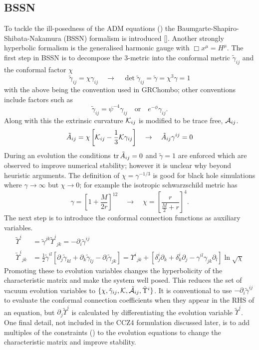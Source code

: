 \subsection{BSSN}
To tackle the ill-posedness of the ADM equations () the Baumgarte-Shapiro-Shibata-Nakamura (BSSN) formalism is introduced []. Another strongly hyperbolic formalism is the generalised harmonic gauge \cite{harmonic} with $ \Box x^\mu = H^\mu$. The first step in BSSN is to decompose the 3-metric into the conformal metric $\tilde{\gamma}_{ij}$ and the conformal factor $\chi$
\begin{equation} \tilde{\gamma}_{ij} = \chi \gamma_{ij}\quad\rightarrow\quad \det{\tilde{\gamma}_{ij}} = \tilde{\gamma} = \chi^3\gamma = 1\end{equation}
with the above being the convention used in GRChombo; other conventions include factors such as
\[  \tilde{\gamma}_{ij} = \psi^{-4}\gamma_{ij} \quad \mathrm{or} \quad e^{-\phi}\gamma_{ij}.\]
 Along with this the extrinsic curvature $\mathcal{K}_{ij}$ is modified to be trace free, $\mathcal{A}_{ij}$.
\[ \tilde{A}_{ij} = \chi\left[ \mathcal{K}_{ij}-\frac{1}{3}\mathcal{K}\gamma_{ij}\right]\quad\rightarrow \quad\tilde{A}_{ij}\gamma^{ij}=0\]
During an evolution the conditions $\trace{\tilde{A}_{ij}=0}$  and $\tilde{\gamma}=1$ are enforced which are observed to improve numerical stability; however it is unclear why beyond heuristic arguments. The definition of $\chi = \gamma^{-1/3}$ is good for black hole simulations where $\gamma\rightarrow\infty$ but $\chi \rightarrow 0$; for example the isotropic schwarzschild metric has \[\gamma = \left[ 1+ \frac{M}{2r}\right]^{12}\quad \rightarrow \quad \chi =\left[ \frac{r}{\frac{M}{2} + r}\right]^4.\] 
The next step is to introduce the conformal connection functions as auxiliary variables. 
\begin{align} \tilde{\Upsilon}^i &= \tilde{\gamma}^{jk}\tilde{\Upsilon}^i_{\,\;jk} = -\partial_i \tilde{\gamma}^{ij}\\
 \tilde{\Upsilon}^i_{\,\;jk} &= \frac{1}{2}\tilde{\gamma}^{il}\left[ \partial_j \tilde{\gamma}_{kl} + \partial_k \tilde{\gamma}_{lj} - \partial_l \tilde{\gamma}_{jk}\right] = \Upsilon^i_{\;\,jk} + \left[ \delta^i_j \partial_k + \delta^i_k \partial_j - \gamma^{il}\gamma_{jk}\partial_l\right] \ln \sqrt{\chi}\end{align}
Promoting these to evolution variables changes the hyperbolicity of the characteristic matrix and make the system well posed. This reduces the set of vacuum evolution variables to $\{\chi,\tilde{\gamma}_{ij},\mathcal{K},\tilde{\mathcal{A}}_{ij},\tilde{\Upsilon}^i \}$. It is conventional to use $-\partial_i \tilde{\gamma}^{ij}$ to evaluate the conformal connection coefficients when they appear in the RHS of an equation, but $\partial_j \tilde{\Upsilon}^i$ is calculated by differentiating the evolution variable $\tilde{\Upsilon}^i$. One final detail, not included in the CCZ4 formulation discussed later, is to add multiples of the constraints () to the evolution equations to change the characteristic matrix and improve stability.


